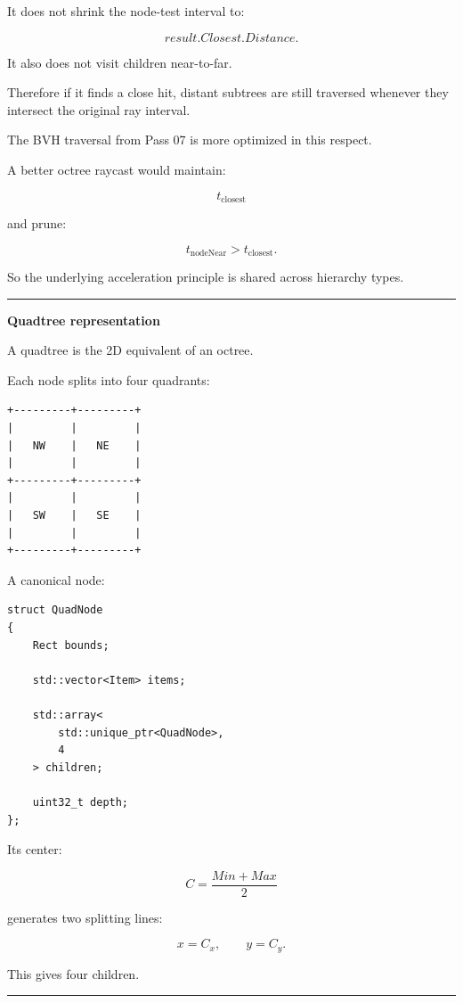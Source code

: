 It does not shrink the node-test interval to:

\[
result.Closest.Distance.
\]

It also does not visit children near-to-far.

Therefore if it finds a close hit, distant subtrees are still traversed whenever they intersect the original ray interval.

The BVH traversal from Pass 07 is more optimized in this respect.

A better octree raycast would maintain:

\[
t_{\text{closest}}
\]

and prune:

\[
t_{\text{nodeNear}}>
t_{\text{closest}}.
\]

So the underlying acceleration principle is shared across hierarchy types.

\begin{center}\rule{0.5\linewidth}{0.5pt}\end{center}

\textbf{Quadtree representation}

A quadtree is the 2D equivalent of an octree.

Each node splits into four quadrants:

\begin{verbatim}
+---------+---------+
|         |         |
|   NW    |   NE    |
|         |         |
+---------+---------+
|         |         |
|   SW    |   SE    |
|         |         |
+---------+---------+
\end{verbatim}

A canonical node:

\begin{verbatim}
struct QuadNode
{
    Rect bounds;

    std::vector<Item> items;

    std::array<
        std::unique_ptr<QuadNode>,
        4
    > children;

    uint32_t depth;
};
\end{verbatim}

Its center:

\[
C=
\frac{Min+Max}{2}
\]

generates two splitting lines:

\[
x=C_x,
\qquad
y=C_y.
\]

This gives four children.

\begin{center}\rule{0.5\linewidth}{0.5pt}\end{center}

